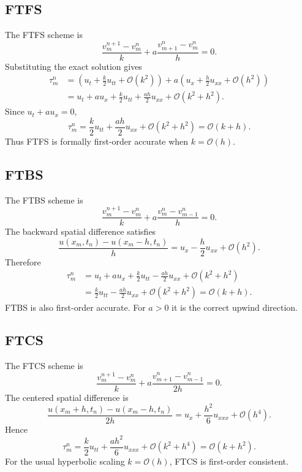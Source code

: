 \documentclass[11pt]{article}
\newcommand{\Oh}{\mathcal{O}}
\begin{document}
\subsection{FTFS}

The FTFS scheme is
\begin{equation}
    \frac{v_m^{n+1}-v_m^n}{k}
    +a\frac{v_{m+1}^n-v_m^n}{h}=0.
\end{equation}
Substituting the exact solution gives
\begin{align}
    \tau_m^n
    &=
    \left(u_t+\frac{k}{2}u_{tt}+\Oh(k^2)\right)
    +a\left(u_x+\frac{h}{2}u_{xx}+\Oh(h^2)\right)\\
    &=u_t+a u_x+\frac{k}{2}u_{tt}+\frac{ah}{2}u_{xx}
    +\Oh(k^2+h^2).
\end{align}
Since $u_t+a u_x=0$,
\begin{equation}
    \tau_m^n
    =
    \frac{k}{2}u_{tt}+\frac{ah}{2}u_{xx}
    +\Oh(k^2+h^2)
    =\Oh(k+h).
\end{equation}
Thus FTFS is formally first-order accurate when $k=\Oh(h)$.

\subsection{FTBS}

The FTBS scheme is
\begin{equation}
    \frac{v_m^{n+1}-v_m^n}{k}
    +a\frac{v_m^n-v_{m-1}^n}{h}=0.
\end{equation}
The backward spatial difference satisfies
\begin{equation}
    \frac{u(x_m,t_n)-u(x_m-h,t_n)}{h}
    =
    u_x-\frac{h}{2}u_{xx}+\Oh(h^2).
\end{equation}
Therefore
\begin{align}
    \tau_m^n
    &=
    u_t+a u_x+\frac{k}{2}u_{tt}
    -\frac{ah}{2}u_{xx}
    +\Oh(k^2+h^2)\\
    &=
    \frac{k}{2}u_{tt}
    -\frac{ah}{2}u_{xx}
    +\Oh(k^2+h^2)
    =\Oh(k+h).
\end{align}
FTBS is also first-order accurate.  For $a>0$ it is the correct upwind direction.

\subsection{FTCS}

The FTCS scheme is
\begin{equation}
    \frac{v_m^{n+1}-v_m^n}{k}
    +a\frac{v_{m+1}^n-v_{m-1}^n}{2h}=0.
\end{equation}
The centered spatial difference is
\begin{equation}
    \frac{u(x_m+h,t_n)-u(x_m-h,t_n)}{2h}
    =
    u_x+\frac{h^2}{6}u_{xxx}+\Oh(h^4).
\end{equation}
Hence
\begin{equation}
    \tau_m^n
    =
    \frac{k}{2}u_{tt}
    +\frac{a h^2}{6}u_{xxx}
    +\Oh(k^2+h^4)
    =
    \Oh(k+h^2).
\end{equation}
For the usual hyperbolic scaling $k=\Oh(h)$, FTCS is first-order consistent.
\end{document}
